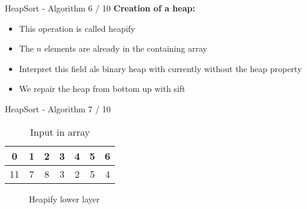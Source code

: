 
\begin{frame}{HeapSort - Algorithm 6 / 10}
  \textbf{Creation of a heap:}
  \begin{itemize}
    \item
      This operation is called {\color{Mittel-Blau}heapify}
    \item
      The {\color{Mittel-Blau}$n$} elements are already in the containing array
    \item
      Interpret this field als binary heap with currently without the
      {\color{Mittel-Blau}heap property}
    \item
      We repair the heap from bottom up with {\color{Mittel-Blau}sift}
  \end{itemize}
\end{frame}


\begin{frame}{HeapSort - Algorithm 7 / 10}
  \vspace{-1.0em}
  \begin{table}[!h]%
    \caption{Input in array}%
    \label{tab:heapify_numbers}%
    \begin{tabular}{ccccccc}
      {\color{Mittel-Gruen}0}&
      {\color{Mittel-Gruen}1}&
      {\color{Mittel-Gruen}2}&
      {\color{Mittel-Gruen}3}&
      {\color{Mittel-Gruen}4}&
      {\color{Mittel-Gruen}5}&
      {\color{Mittel-Gruen}6}\\
      \hline
      \multicolumn{1}{|c}{11}&%
      \multicolumn{1}{|c}{7}&%
      \multicolumn{1}{|c}{8}&%
      \multicolumn{1}{|c}{3}&%
      \multicolumn{1}{|c}{2}&%
      \multicolumn{1}{|c}{5}&%
      \multicolumn{1}{|c|}{4}\\
      \hline
    \end{tabular}
  \end{table}
  \vspace*{-0.5em}
  \begin{centering}
    \begin{figure}[!h]%
      \begin{columns}%
        \begin{column}{0.425\textwidth}%
          \begin{adjustbox}{width=\linewidth}%
          \end{adjustbox}%
        \end{column}%
        \begin{column}{0.425\textwidth}%
          \begin{adjustbox}{width=\linewidth}%
          \end{adjustbox}%
        \end{column}%
      \end{columns}%
      \caption{Heapify lower layer}%
      \label{fig:heapify_lower}%
    \end{figure}
  \end{centering}
\end{frame}

